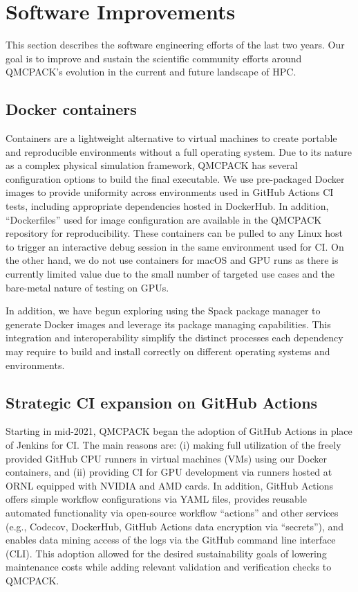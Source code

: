 
\section{Software Improvements}
\label{sec:Software-Improvements}

This section describes the software engineering efforts of the last two years. Our goal is to improve and sustain the scientific community efforts around QMCPACK's evolution in the current and future landscape of HPC.

\subsection{Docker containers}

Containers are a lightweight alternative to virtual machines to create portable and reproducible environments without a full operating system.
Due to its nature as a complex physical simulation framework, QMCPACK has several configuration options to build the final executable.
We use pre-packaged Docker images to provide uniformity across environments used in GitHub Actions CI tests, including appropriate dependencies hosted in DockerHub.
In addition, ``Dockerfiles'' used for image configuration are available in the QMCPACK repository for reproducibility.
These containers can be pulled to any Linux host to trigger an interactive debug session in the same environment used for CI.
On the other hand, we do not use containers for macOS and GPU runs as there is currently limited value due to the small number of targeted use cases and the bare-metal nature of testing on GPUs. 

In addition, we have begun exploring using the Spack package manager to generate Docker images and leverage its package managing capabilities.
This integration and interoperability simplify the distinct processes each dependency may require to build and install correctly on different operating systems and environments.

\subsection{Strategic CI expansion on GitHub Actions}

Starting in mid-2021, QMCPACK began the adoption of GitHub Actions in place of Jenkins for CI.
The main reasons are:
(i) making full utilization of the freely provided GitHub CPU runners in virtual machines (VMs) using our Docker containers, and
(ii) providing CI for GPU development via runners hosted at ORNL equipped with NVIDIA and AMD cards. In addition, GitHub Actions offers simple workflow configurations via YAML files, provides reusable automated functionality via open-source workflow ``actions'' and other services (e.g., Codecov, DockerHub, GitHub Actions data encryption via ``secrets''), and enables data mining access of the logs via the GitHub command line interface (CLI). This adoption allowed for the desired sustainability goals of lowering maintenance costs while adding relevant validation and verification checks to QMCPACK.

